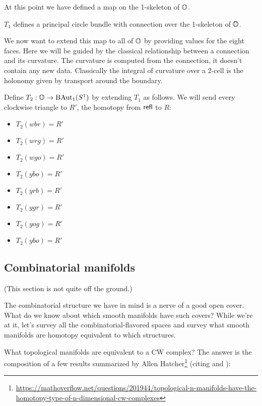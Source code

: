 At this point we have defined a map on the 1-skeleton of \( \mathbb{O} \).

\begin{myclaim}
\( T_1 \) defines a principal circle bundle with connection over the 1-skeleton of \( \mathbb{O} \).
\end{myclaim}

We now want to extend this map to all of \( \mathbb{O} \) by providing values for the eight faces. Here we will be guided by the classical relationship between a connection and its curvature. The curvature is computed from the connection, it doesn't contain any new data. Classically the integral of curvature over a 2-cell is the holonomy given by transport around the boundary. 

\begin{mydef}
Define \( T_2:\mathbb{O}\to\mathrm{BAut}_1(S^1) \) by extending \( T_1 \) as follows. We will send every clockwise triangle to \( R' \), the homotopy from \( \mathsf{refl} \) to \( R \):
\begin{itemize}
\item \( T_2(wbr)=R' \) 
\item \( T_2(wrg)=R' \)
\item \( T_2(wgo)=R' \)
\item \( T_2(ybo)=R' \)
\item \( T_2(yrb)=R' \) 
\item \( T_2(ygr)=R' \)
\item \( T_2(yog)=R' \)
\item \( T_2(ybo)=R' \)
\end{itemize}
\end{mydef}


\subsection{Combinatorial manifolds}

(This section is not quite off the ground.)

The combinatorial structure we have in mind is a nerve of a good open cover. What do we know about which smooth manifolds have such covers? While we're at it, let's survey all the combinatorial-flavored spaces and survey what smooth manifolds are homotopy equivalent to which structures.

What topological manifolds are equivalent to a CW complex? The answer is the composition of a few results summarized by Allen Hatcher\footnote{\url{https://mathoverflow.net/questions/201944/topological-n-manifolds-have-the-homotopy-type-of-n-dimensional-cw-complexes}} (citing \cite{kirby_siebenmann} and \cite{freedman_quinn}):

